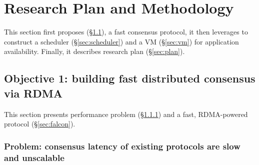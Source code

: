 \vspace{-.15in}\section{Research Plan and Methodology}
\label{sec:rep}\vspace{-.075in}

This section first proposes \falcon 
(\S\ref{sec:protocol}), a fast consensus protocol, it then leverages \falcon to 
construct a scheduler (\S\ref{sec:scheduler}) and a VM (\S\ref{sec:vm}) for 
application availability. Finally, it describes 
research plan (\S\ref{sec:plan}).

\vspace{-.15in}\subsection{Objective 1: building fast distributed consensus via
RDMA}\label{sec:protocol}\vspace{-.075in}

This section presents \paxos performance problem (\S\ref{sec:latency-problem}) 
and a fast, RDMA-powered protocol (\S\ref{sec:falcon}).

\vspace{-.15in}
\subsubsection{Problem: consensus latency of existing \paxos 
protocols are slow and unscalable} 
\label{sec:latency-problem}\vspace{-.075in}



